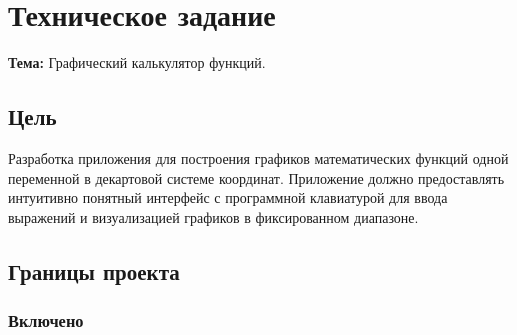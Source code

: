 \documentclass[a4paper, final]{article}
\begin{document}
\section{Техническое задание}

\textbf{Тема:} Графический калькулятор функций.

\subsection{Цель}

Разработка приложения для построения графиков математических функций одной
переменной в декартовой системе координат. Приложение должно предоставлять
интуитивно понятный интерфейс с программной клавиатурой для ввода выражений
и визуализацией графиков в фиксированном диапазоне.

\subsection{Границы проекта}

\subsubsection*{Включено}
\end{document}
